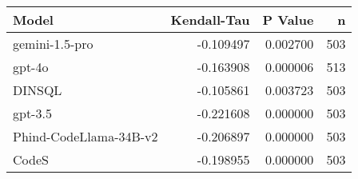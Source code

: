 \begin{tabular}{lrrr}
\toprule
Model & Kendall-Tau & P Value & n \\
\midrule
gemini-1.5-pro & -0.109497 & 0.002700 & 503 \\
gpt-4o & -0.163908 & 0.000006 & 513 \\
DINSQL & -0.105861 & 0.003723 & 503 \\
gpt-3.5 & -0.221608 & 0.000000 & 503 \\
Phind-CodeLlama-34B-v2 & -0.206897 & 0.000000 & 503 \\
CodeS & -0.198955 & 0.000000 & 503 \\
\bottomrule
\end{tabular}
